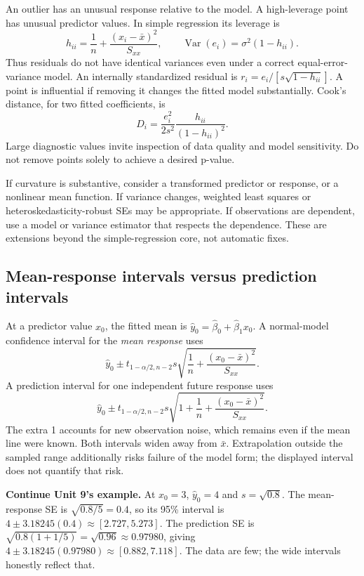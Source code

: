 An outlier has an unusual response relative to the model. A high-leverage
point has unusual predictor values. In simple regression its leverage is
\[
h_{ii}=\frac1n+\frac{(x_i-\bar x)^2}{S_{xx}},\qquad
\operatorname{Var}(e_i)=\sigma^2(1-h_{ii}).
\]
Thus residuals do not have identical variances even under a correct
equal-error-variance model. An internally standardized residual is
$r_i=e_i/[s\sqrt{1-h_{ii}}]$. A point is influential if removing it changes
the fitted model substantially. Cook's distance, for two fitted coefficients,
is
\[
D_i=\frac{e_i^2}{2s^2}\frac{h_{ii}}{(1-h_{ii})^2}.
\]
Large diagnostic values invite inspection of data quality and model
sensitivity. Do not remove points solely to achieve a desired p-value.

If curvature is substantive, consider a transformed predictor or response,
or a nonlinear mean function. If variance changes, weighted least squares
or heteroskedasticity-robust SEs may be appropriate. If observations are
dependent, use a model or variance estimator that respects the dependence.
These are extensions beyond the simple-regression core, not automatic fixes.

\subsection{Mean-response intervals versus prediction intervals}
At a predictor value $x_0$, the fitted mean is
$\hat y_0=\hat\beta_0+\hat\beta_1x_0$.
A normal-model confidence interval for the \emph{mean response} uses
\[
\hat y_0\pm t_{1-\alpha/2,n-2}s
\sqrt{\frac1n+\frac{(x_0-\bar x)^2}{S_{xx}}}.
\]
A prediction interval for one independent future response uses
\[
\hat y_0\pm t_{1-\alpha/2,n-2}s
\sqrt{1+\frac1n+\frac{(x_0-\bar x)^2}{S_{xx}}}.
\]
The extra 1 accounts for new observation noise, which remains even if the
mean line were known. Both intervals widen away from $\bar x$.
Extrapolation outside the sampled range additionally risks failure of the
model form; the displayed interval does not quantify that risk.

\textbf{Continue Unit 9's example.} At $x_0=3$, $\hat y_0=4$ and
$s=\sqrt{0.8}$. The mean-response SE is $\sqrt{0.8/5}=0.4$, so its
95\% interval is $4\pm3.18245(0.4)\approx[2.727,5.273]$.
The prediction SE is $\sqrt{0.8(1+1/5)}=\sqrt{0.96}\approx0.97980$,
giving $4\pm3.18245(0.97980)\approx[0.882,7.118]$.
The data are few; the wide intervals honestly reflect that.

